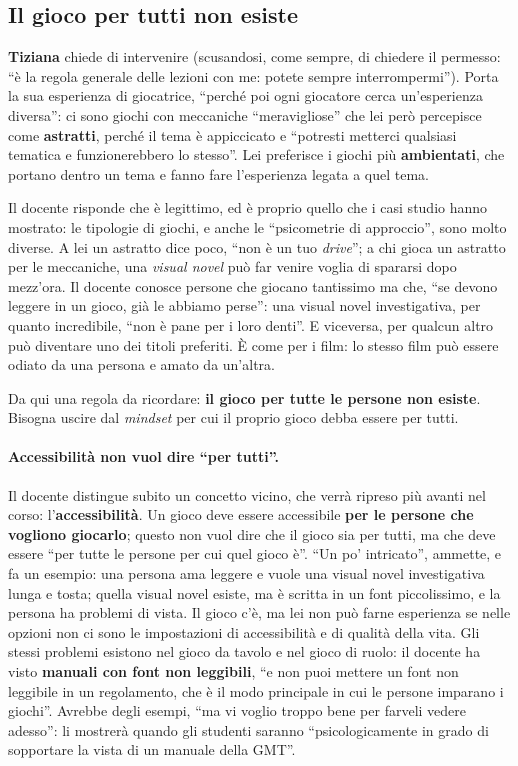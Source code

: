 \subsection{Il gioco per tutti non esiste}

\textbf{Tiziana} chiede di intervenire (scusandosi, come sempre, di chiedere il
permesso: ``è la regola generale delle lezioni con me: potete sempre
interrompermi''). Porta la sua esperienza di giocatrice, ``perché poi ogni
giocatore cerca un'esperienza diversa'': ci sono giochi con meccaniche
``meravigliose'' che lei però percepisce come \textbf{astratti}, perché il tema
è appiccicato e ``potresti metterci qualsiasi tematica e funzionerebbero lo
stesso''. Lei preferisce i giochi più \textbf{ambientati}, che portano dentro un
tema e fanno fare l'esperienza legata a quel tema.

Il docente risponde che è legittimo, ed è proprio quello che i casi studio
hanno mostrato: le tipologie di giochi, e anche le ``psicometrie di approccio'',
sono molto diverse. A lei un astratto dice poco, ``non è un tuo
\emph{drive}''; a chi gioca un astratto per le meccaniche, una
\emph{visual novel} può far venire voglia di spararsi dopo mezz'ora. Il docente
conosce persone che giocano tantissimo ma che, ``se devono leggere in un gioco,
già le abbiamo perse'': una visual novel investigativa, per quanto incredibile,
``non è pane per i loro denti''. E viceversa, per qualcun altro può diventare
uno dei titoli preferiti. È come per i film: lo stesso film può essere odiato da
una persona e amato da un'altra.

Da qui una regola da ricordare: \textbf{il gioco per tutte le persone non
esiste}. Bisogna uscire dal \emph{mindset} per cui il proprio gioco debba essere
per tutti.

\paragraph{Accessibilità non vuol dire ``per tutti''.} Il docente distingue
subito un concetto vicino, che verrà ripreso più avanti nel corso:
l'\textbf{accessibilità}. Un gioco deve essere accessibile \textbf{per le
persone che vogliono giocarlo}; questo non vuol dire che il gioco sia per tutti,
ma che deve essere ``per tutte le persone per cui quel gioco è''. ``Un po'
intricato'', ammette, e fa un esempio: una persona ama leggere e vuole una visual
novel investigativa lunga e tosta; quella visual novel esiste, ma è scritta in
un font piccolissimo, e la persona ha problemi di vista. Il gioco c'è, ma lei non
può farne esperienza se nelle opzioni non ci sono le impostazioni di
accessibilità e di qualità della vita. Gli stessi problemi esistono nel gioco da
tavolo e nel gioco di ruolo: il docente ha visto \textbf{manuali con font non
leggibili}, ``e non puoi mettere un font non leggibile in un regolamento, che è
il modo principale in cui le persone imparano i giochi''. Avrebbe degli esempi,
``ma vi voglio troppo bene per farveli vedere adesso'': li mostrerà quando gli
studenti saranno ``psicologicamente in grado di sopportare la vista di un manuale
della GMT''.

